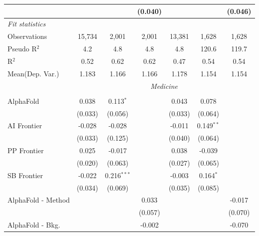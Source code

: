 \begin{tabular}{lcccccc}
                                 &              &              & (0.040)      &              &               & (0.046)\\   
   \midrule
   \emph{Fit statistics}\\
   Observations                  & 15,734       & 2,001        & 2,001        & 13,381       & 1,628         & 1,628\\  
   Pseudo R$^2$                  & 4.2          & 4.8          & 4.8          & 4.8          & 120.6         & 119.7\\  
   R$^2$                         & 0.52         & 0.62         & 0.62         & 0.47         & 0.54          & 0.54\\  
   
Mean(Dep. Var.) & 1.183 & 1.166 & 1.166 & 1.178 & 1.154 & 1.154 \\
 & \multicolumn{6}{c}{\textit{Medicine}} \\ \\
   AlphaFold                   & 0.038   & 0.113$^{*}$   &               & 0.043   & 0.078        &   \\   
                               & (0.033) & (0.056)       &               & (0.033) & (0.064)      &   \\   
   AI Frontier                 & -0.028  & -0.028        &               & -0.011  & 0.149$^{**}$ &   \\   
                               & (0.033) & (0.125)       &               & (0.040) & (0.064)      &   \\   
   PP Frontier                 & 0.025   & -0.017        &               & 0.038   & -0.039       &   \\   
                               & (0.020) & (0.063)       &               & (0.027) & (0.065)      &   \\   
   SB Frontier                 & -0.022  & 0.216$^{***}$ &               & -0.003  & 0.164$^{*}$  &   \\   
                               & (0.034) & (0.069)       &               & (0.035) & (0.085)      &   \\   
   AlphaFold - Method          &         &               & 0.033         &         &              & -0.017\\   
                               &         &               & (0.057)       &         &              & (0.070)\\   
   AlphaFold - Bkg.            &         &               & -0.002        &         &              & -0.070\\   

\end{tabular}
